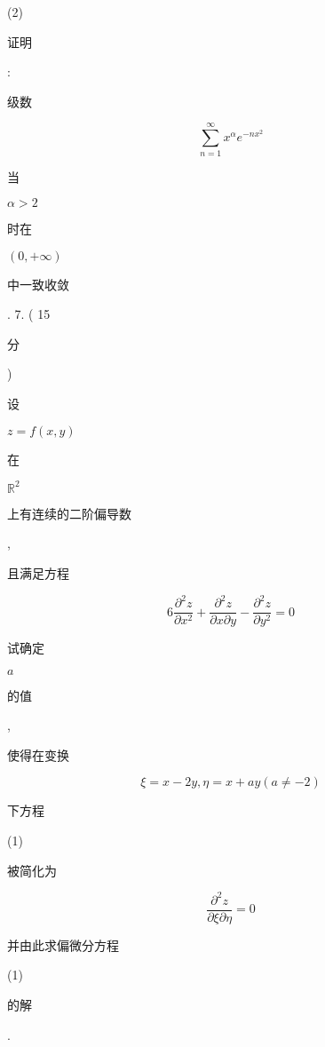 \documentclass[10pt]{article}
\begin{document}
(2) \begin{CJK}{UTF8}{mj}证明\end{CJK}: \begin{CJK}{UTF8}{mj}级数\end{CJK}
$$
\sum_{n=1}^{\infty} x^{\alpha} e^{-n x^{2}}
$$
\begin{CJK}{UTF8}{mj}当\end{CJK} $\alpha>2$ \begin{CJK}{UTF8}{mj}时在\end{CJK} $(0,+\infty)$ \begin{CJK}{UTF8}{mj}中一致收敛\end{CJK}. 7. ( 15 \begin{CJK}{UTF8}{mj}分\end{CJK}) \begin{CJK}{UTF8}{mj}设\end{CJK} $z=f(x, y)$ \begin{CJK}{UTF8}{mj}在\end{CJK} $\mathbb{R}^{2}$ \begin{CJK}{UTF8}{mj}上有连续的二阶偏导数\end{CJK}, \begin{CJK}{UTF8}{mj}且满足方程\end{CJK}
$$
6 \frac{\partial^{2} z}{\partial x^{2}}+\frac{\partial^{2} z}{\partial x \partial y}-\frac{\partial^{2} z}{\partial y^{2}}=0
$$
\begin{CJK}{UTF8}{mj}试确定\end{CJK} $a$ \begin{CJK}{UTF8}{mj}的值\end{CJK}, \begin{CJK}{UTF8}{mj}使得在变换\end{CJK}
$$
\xi=x-2 y, \eta=x+a y(a \neq-2)
$$
\begin{CJK}{UTF8}{mj}下方程\end{CJK} (1) \begin{CJK}{UTF8}{mj}被简化为\end{CJK}
$$
\frac{\partial^{2} z}{\partial \xi \partial \eta}=0
$$
\begin{CJK}{UTF8}{mj}并由此求偏微分方程\end{CJK} (1) \begin{CJK}{UTF8}{mj}的解\end{CJK}.
\end{document}
